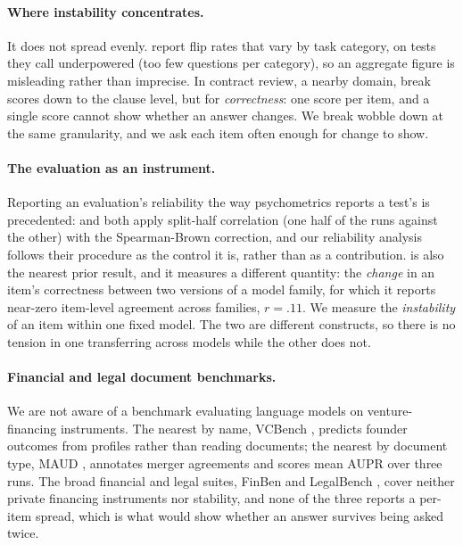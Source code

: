 \documentclass[11pt]{article}
\begin{document}
\paragraph{Where instability concentrates.} It does not spread evenly.
\citet{yagubyan-2026-coin} report flip rates that vary by task category, on tests they call
underpowered (too few questions per category), so an aggregate figure is misleading rather than
imprecise. In contract review, a nearby domain, \citet{liu-etal-2025-contracteval} break scores
down to the clause level, but for \emph{correctness}: one score per item, and a single score
cannot show whether an answer changes. We break wobble down at the same granularity, and we ask
each item often enough for change to show.

\paragraph{The evaluation as an instrument.} Reporting an evaluation's reliability the way
psychometrics reports a test's is precedented: \citet{cacioli-2026-beyond} and
\citet{contreras-2026-llm} both apply split-half correlation (one half of the runs against the
other) with the Spearman-Brown correction, and our reliability analysis follows their procedure as
the control it is, rather than as a contribution. \citet{cacioli-2026-beyond} is also the nearest
prior result, and it measures a different quantity: the \emph{change} in an item's correctness
between two versions of a model family, for which it reports near-zero item-level agreement across
families, $r = .11$. We measure the \emph{instability} of an item within one fixed model. The two
are different constructs, so there is no tension in one transferring across models while the other
does not.

\paragraph{Financial and legal document benchmarks.} We are not aware of a benchmark evaluating
language models on venture-financing instruments. The nearest by name, VCBench
\citep{chen-etal-2025-vcbench}, predicts founder outcomes from profiles rather than reading
documents; the nearest by document type, MAUD \citep{wang-etal-2023-maud}, annotates merger
agreements and scores mean AUPR over three runs. The broad financial and legal suites, FinBen
\citep{xie-etal-2024-finben} and LegalBench \citep{guha-etal-2023-legalbench}, cover neither
private financing instruments nor stability, and none of the three reports a per-item spread, which
is what would show whether an answer survives being asked twice.
\end{document}
